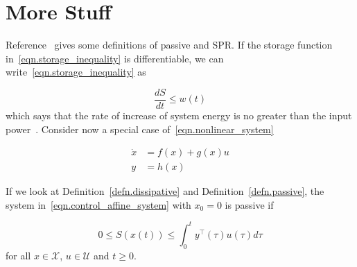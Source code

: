 \begin{example}


\end{example}

\section{More Stuff}

Reference~\cite{kottenstette.passive.2010} gives some definitions of passive and SPR.\@
If the storage function in~\eqref{eqn.storage_inequality} is differentiable, we can write~\eqref{eqn.storage_inequality} as

\begin{equation*}
  \frac{dS}{dt}\leq w(t)
\end{equation*}
which says that the rate of increase of system energy is no greater than the input power~\cite{bao.process.2007}.
Consider now a special case of~\eqref{eqn.nonlinear_system}


\begin{equation}
  \label{eqn.control_affine_system}
  \begin{split}
    \dot{x} & = f(x) + g(x)u \\
    y & = h(x)
  \end{split}
\end{equation}

If we look at Definition~\ref{defn.dissipative} and Definition~\ref{defn.passive}, the system in~\eqref{eqn.control_affine_system} with $x_{0}=0$ is passive if

\begin{equation}
  \label{eqn.passive}
  0\leq S(x(t))\leq\int_{0}^{t}y^{\top}(\tau)u(\tau)d\tau
\end{equation}
for all $x\in \mathcal{X}$, $u\in \mathcal{U}$ and $t\geq0$.

